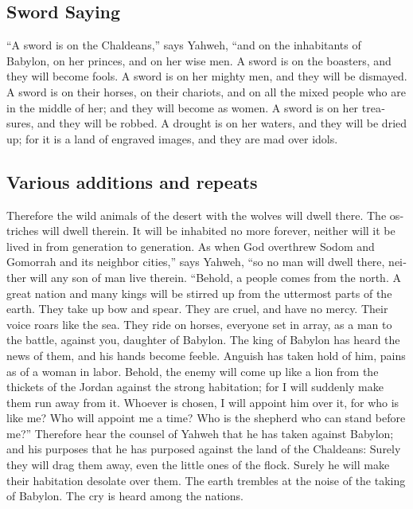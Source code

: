 \begin{paracol}{2}
\begin{otherlanguage}{english}
\hypertarget{sword-saying}{%
\subsection{Sword Saying}\label{sword-saying}}

 ``A sword is on the Chaldeans,'' says Yahweh, ``and on
the inhabitants of Babylon, on her princes, and on her wise men.
 A sword is on the boasters, and they will become fools.
A sword is on her mighty men, and they will be dismayed. 
A sword is on their horses, on their chariots, and on all the mixed
people who are in the middle of her; and they will become as women. A
sword is on her treasures, and they will be robbed.  A
drought is on her waters, and they will be dried up; for it is a land of
engraved images, and they are mad over idols.

\hypertarget{various-additions-and-repeats}{%
\subsection{Various additions and
repeats}\label{various-additions-and-repeats}}

 Therefore the wild animals of the desert with the wolves
will dwell there. The ostriches will dwell therein. It will be inhabited
no more forever, neither will it be lived in from generation to
generation.  As when God overthrew Sodom and Gomorrah and
its neighbor cities,'' says Yahweh, ``so no man will dwell there,
neither will any son of man live therein.  ``Behold, a
people comes from the north. A great nation and many kings will be
stirred up from the uttermost parts of the earth.  They
take up bow and spear. They are cruel, and have no mercy. Their voice
roars like the sea. They ride on horses, everyone set in array, as a man
to the battle, against you, daughter of Babylon.  The
king of Babylon has heard the news of them, and his hands become feeble.
Anguish has taken hold of him, pains as of a woman in labor.
 Behold, the enemy will come up like a lion from the
thickets of the Jordan against the strong habitation; for I will
suddenly make them run away from it. Whoever is chosen, I will appoint
him over it, for who is like me? Who will appoint me a time? Who is the
shepherd who can stand before me?''  Therefore hear the
counsel of Yahweh that he has taken against Babylon; and his purposes
that he has purposed against the land of the Chaldeans: Surely they will
drag them away, even the little ones of the flock. Surely he will make
their habitation desolate over them.  The earth trembles
at the noise of the taking of Babylon. The cry is heard among the
nations.


\end{otherlanguage}
\end{paracol}
